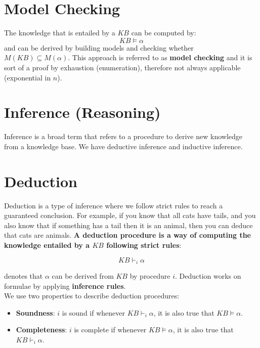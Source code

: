 \documentclass{article}
\begin{document}
\newpage

\section{Model Checking}

The knowledge that is entailed by a $KB$ can be computed by:
\begin{equation*}
    KB \models \alpha
\end{equation*}
and can be derived by building models and checking whether $M(KB) \subseteq M(\alpha)$.
This approach is referred to as \textbf{model checking} and it is sort of a proof by exhaustion (enumeration), therefore not always applicable (exponential in $n$).

\section{Inference (Reasoning)}

Inference is a broad term that refers to a procedure to derive new knowledge from a knowledge base. We have deductive inference and inductive inference.

\section{Deduction}

Deduction is a type of inference where we follow strict rules to reach a guaranteed conclusion. For example, if you know that all cats have tails, and you also know that if something has a tail then it is an animal, then you can deduce that cats are animals. \textbf{A deduction procedure is a way of computing the knowledge entailed by a $KB$ following strict rules}:

\begin{equation*}
    KB \vdash_i \alpha
\end{equation*}

denotes that $\alpha$ can be derived from $KB$ by procedure $i$. Deduction works on formulae by applying \textbf{inference rules}. \\

We use two properties to describe deduction procedures:

\begin{itemize}
    \item \textbf{Soundness}: $i$ is sound if whenever $KB \vdash_i \alpha$, it is also true that $KB \models \alpha$.
    \item \textbf{Completeness}: $i$ is complete if whenever $KB \models \alpha$, it is also true that $KB \vdash_i \alpha$.
\end{itemize}
\end{document}
